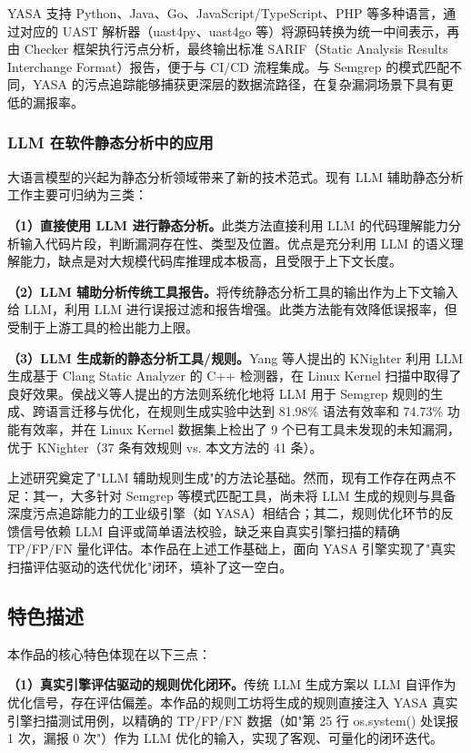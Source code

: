 \documentclass[a4paper,12pt,UTF8]{ctexart}
\numberwithin{figure}{section}
\numberwithin{table}{section}
\numberwithin{equation}{section}
\begin{document}
{YASA 支持 Python、Java、Go、JavaScript/TypeScript、PHP 等多种语言，通过对应的 UAST 解析器（uast4py、uast4go 等）将源码转换为统一中间表示，再由 Checker 框架执行污点分析，最终输出标准 SARIF（Static Analysis Results Interchange Format）报告，便于与 CI/CD 流程集成。与 Semgrep 的模式匹配不同，YASA 的污点追踪能够捕获更深层的数据流路径，在复杂漏洞场景下具有更低的漏报率。

\subsubsection{LLM 在软件静态分析中的应用}

大语言模型的兴起为静态分析领域带来了新的技术范式。现有 LLM 辅助静态分析工作主要可归纳为三类：

\textbf{（1）直接使用 LLM 进行静态分析。}此类方法直接利用 LLM 的代码理解能力分析输入代码片段，判断漏洞存在性、类型及位置\cite{yang2024,hossain2024}。优点是充分利用 LLM 的语义理解能力，缺点是对大规模代码库推理成本极高，且受限于上下文长度。

\textbf{（2）LLM 辅助分析传统工具报告。}将传统静态分析工具的输出作为上下文输入给 LLM，利用 LLM 进行误报过滤和报告增强\cite{li2024,chapman2024}。此类方法能有效降低误报率，但受制于上游工具的检出能力上限。

\textbf{（3）LLM 生成新的静态分析工具/规则。}Yang 等人提出的 KNighter 利用 LLM 生成基于 Clang Static Analyzer 的 C++ 检测器，在 Linux Kernel 扫描中取得了良好效果\cite{yang2025}。侯战义等人提出的方法\cite{hou2025}则系统化地将 LLM 用于 Semgrep 规则的生成、跨语言迁移与优化，在规则生成实验中达到 81.98\% 语法有效率和 74.73\% 功能有效率，并在 Linux Kernel 数据集上检出了 9 个已有工具未发现的未知漏洞，优于 KNighter（37 条有效规则 vs. 本文方法的 41 条）。

上述研究奠定了"LLM 辅助规则生成"的方法论基础。然而，现有工作存在两点不足：其一，大多针对 Semgrep 等模式匹配工具，尚未将 LLM 生成的规则与具备深度污点追踪能力的工业级引擎（如 YASA）相结合；其二，规则优化环节的反馈信号依赖 LLM 自评或简单语法校验，缺乏来自真实引擎扫描的精确 TP/FP/FN 量化评估。本作品在上述工作基础上，面向 YASA 引擎实现了"真实扫描评估驱动的迭代优化"闭环，填补了这一空白。

\subsection{特色描述}

本作品的核心特色体现在以下三点：

\textbf{（1）真实引擎评估驱动的规则优化闭环。}传统 LLM 生成方案以 LLM 自评作为优化信号，存在评估偏差。本作品的规则工坊将生成的规则直接注入 YASA 真实引擎扫描测试用例，以精确的 TP/FP/FN 数据（如"第 25 行 os.system() 处误报 1 次，漏报 0 次"）作为 LLM 优化的输入，实现了客观、可量化的闭环迭代。

}
\end{document}
